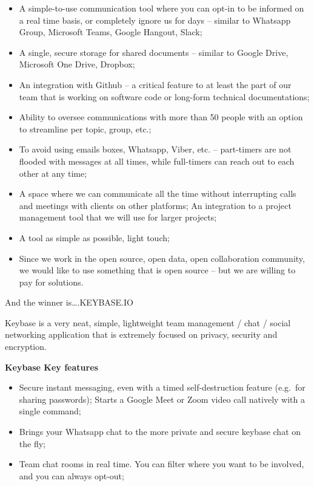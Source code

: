 \documentclass[
  a4paper,
  openany, a4paper, oneside]{book}
\begin{document}
\begin{itemize}
\item
  A simple-to-use communication tool where you can opt-in to be informed on a real time basis, or completely ignore us for days -- similar to Whatsapp Group, Microsoft Teams, Google Hangout, Slack;
\item
  A single, secure storage for shared documents -- similar to Google Drive, Microsoft One Drive, Dropbox;
\item
  An integration with Github -- a critical feature to at least the part of our team that is working on software code or long-form technical documentations;
\item
  Ability to oversee communications with more than 50 people with an option to streamline per topic, group, etc.;
\item
  To avoid using emails boxes, Whatsapp, Viber, etc. -- part-timers are not flooded with messages at all times, while full-timers can reach out to each other at any time;
\item
  A space where we can communicate all the time without interrupting calls and meetings with clients on other platforms;
  An integration to a project management tool that we will use for larger projects;
\item
  A tool as simple as possible, light touch;
\item
  Since we work in the open source, open data, open collaboration community, we would like to use something that is open source -- but we are willing to pay for solutions.
\end{itemize}

And the winner is\ldots.KEYBASE.IO

Keybase is a very neat, simple, lightweight team management / chat / social networking application that is extremely focused on privacy, security and encryption.

\textbf{Keybase Key features}

\begin{itemize}
\item
  Secure instant messaging, even with a timed self-destruction feature (e.g.~for sharing passwords);
  Starts a Google Meet or Zoom video call natively with a single command;
\item
  Brings your Whatsapp chat to the more private and secure keybase chat on the fly;
\item
  Team chat rooms in real time. You can filter where you want to be involved, and you can always opt-out;
\end{itemize}
\end{document}
